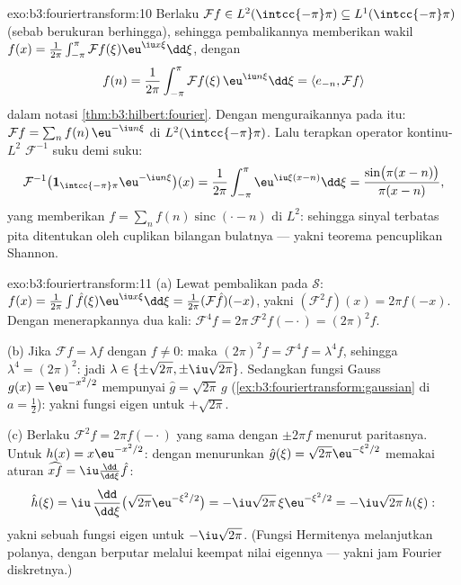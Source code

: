 \begin{solution}{exo:b3:fouriertransform:10}
Berlaku $\mathcal Ff \in L^2(\intcc{-\pi}\pi) \subseteq
L^1(\intcc{-\pi}\pi)$ (sebab berukuran berhingga), sehingga pembalikannya memberikan
wakil  $f(x) =
\frac1{2\pi}\int_{-\pi}^\pi\mathcal Ff(\xi)\eu^{\iu
x\xi}\dd\xi$, dengan
\[
f(n) = \frac1{2\pi}\int_{-\pi}^{\pi}\mathcal
Ff(\xi)\,\eu^{\iu n\xi}\dd\xi = \langle e_{-n}, \mathcal
Ff\rangle
\]
dalam notasi \cref{thm:b3:hilbert:fourier}. Dengan menguraikannya pada
 itu: $\mathcal Ff = \sum_nf(n)\,\eu^{-\iu
n\xi}$ di $L^2(\intcc{-\pi}\pi)$. Lalu terapkan operator
kontinu-$L^2$ $\mathcal F^{-1}$ suku demi suku:
\[
\mathcal F^{-1}\bigl(\mathbf
1_{\intcc{-\pi}\pi}\eu^{-\iu n\xi}\bigr)(x)
= \frac1{2\pi}\int_{-\pi}^{\pi}\eu^{\iu\xi(x - n)}\dd\xi
= \frac{\sin\bigl(\pi(x-n)\bigr)}{\pi(x - n)} ,
\]
yang memberikan $f = \sum_nf(n)\operatorname{sinc}(\cdot - n)$ di
$L^2$: sehingga sinyal terbatas pita ditentukan oleh cuplikan
bilangan bulatnya --- yakni teorema pencuplikan Shannon.
\end{solution}

\begin{solution}{exo:b3:fouriertransform:11}
(a) Lewat pembalikan pada $\mathcal S$: $f(x) =
\frac1{2\pi}\int\hat f(\xi)\eu^{\iu x\xi}\dd\xi =
\frac1{2\pi}(\mathcal F\hat f)(-x)$, yakni $(\mathcal
F^2f)(x) = 2\pi f(-x)$. Dengan menerapkannya dua kali: $\mathcal F^4f =
2\pi\,\mathcal F^2f(-\cdot) = (2\pi)^2f$.

(b) Jika $\mathcal Ff = \lambda f$ dengan $f \neq 0$: maka
$(2\pi)^2f = \mathcal F^4f = \lambda^4f$, sehingga $\lambda^4 =
(2\pi)^2$: jadi $\lambda \in \{\pm\sqrt{2\pi},
\pm\iu\sqrt{2\pi}\}$. Sedangkan fungsi Gauss $g(x) = \eu^{-x^2/2}$ mempunyai
$\hat g = \sqrt{2\pi}\,g$
(\cref{ex:b3:fouriertransform:gaussian} di $a = \frac12$):
yakni fungsi eigen untuk $+\sqrt{2\pi}$.

(c) Berlaku $\mathcal F^2f = 2\pi f(-\cdot)$ yang sama dengan $\pm2\pi f$
menurut paritasnya. Untuk $h(x) = x\eu^{-x^2/2}$:
dengan menurunkan $\hat g(\xi) = \sqrt{2\pi}\eu^{-\xi^2/2}$
memakai aturan $\widehat{xf} = \iu\frac{\dd}{\dd\xi}\hat f$:
\[
\hat h(\xi) = \iu\,\frac{\dd}{\dd\xi}\bigl(\sqrt{2\pi}
\eu^{-\xi^2/2}\bigr) = -\iu\sqrt{2\pi}\,\xi\eu^{-\xi^2/2}
= -\iu\sqrt{2\pi}\,h(\xi) :
\]
yakni sebuah fungsi eigen untuk $-\iu\sqrt{2\pi}$. (Fungsi Hermitenya
melanjutkan polanya, dengan berputar melalui keempat
nilai eigennya --- yakni jam Fourier diskretnya.)

\end{solution}

